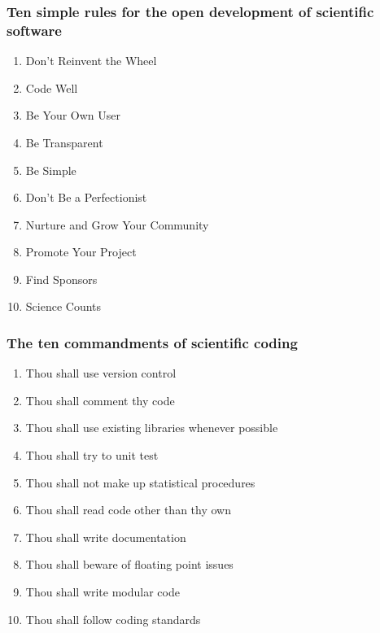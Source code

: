 \documentclass[slidestop]{beamer}
\begin{document}
\begin{frame}
  \frametitle{Ten simple rules for the open development of scientific
    software}
  \begin{enumerate}
    \item Don't Reinvent the Wheel
    \item Code Well
    \item Be Your Own User
    \item Be Transparent
    \item Be Simple
    \item Don't Be a Perfectionist
    \item Nurture and Grow Your Community
    \item Promote Your Project
    \item Find Sponsors
    \item Science Counts
  \end{enumerate}
\end{frame}


\begin{frame}
  \frametitle{The ten commandments of scientific coding}
  \begin{enumerate}
    \item Thou shall use version control
    \item Thou shall comment thy code
    \item Thou shall use existing libraries whenever possible
    \item Thou shall try to unit test
    \item Thou shall not make up statistical procedures
    \item Thou shall read code other than thy own
    \item Thou shall write documentation
    \item Thou shall beware of floating point issues
    \item Thou shall write modular code
    \item Thou shall follow coding standards
  \end{enumerate}
\end{frame}
\end{document}

